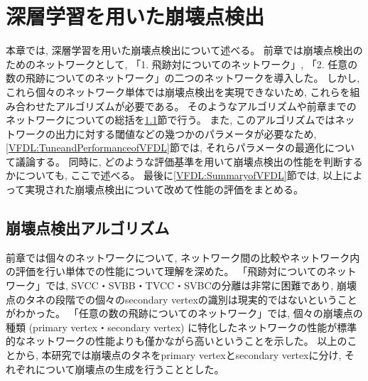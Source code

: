 
\chapter{深層学習を用いた崩壊点検出} \label{chap:VertexFinderwithDL}

本章では, 深層学習を用いた崩壊点検出について述べる。
前章では崩壊点検出のためのネットワークとして, 「1. 飛跡対についてのネットワーク」, 「2. 任意の数の飛跡についてのネットワーク」の二つのネットワークを導入した。
しかし, これら個々のネットワーク単体では崩壊点検出を実現できないため, これらを組み合わせたアルゴリズムが必要である。
そのようなアルゴリズムや前章までのネットワークについての総括を\ref{VFDL:AlgorithmofVFDL}節で行う。
また, このアルゴリズムではネットワークの出力に対する閾値などの幾つかのパラメータが必要なため, \ref{VFDL:TuneandPerformanceofVFDL}節では, それらパラメータの最適化について議論する。
同時に, どのような評価基準を用いて崩壊点検出の性能を判断するかについても, ここで述べる。
最後に\ref{VFDL:SummaryofVFDL}節では, 以上によって実現された崩壊点検出について改めて性能の評価をまとめる。


\section{崩壊点検出アルゴリズム} \label{VFDL:AlgorithmofVFDL}

前章では個々のネットワークについて, ネットワーク間の比較やネットワーク内の評価を行い単体での性能について理解を深めた。
「飛跡対についてのネットワーク」では, SVCC・SVBB・TVCC・SVBCの分離は非常に困難であり, 崩壊点のタネの段階での個々のsecondary vertexの識別は現実的ではないということがわかった。
「任意の数の飛跡についてのネットワーク」では, 個々の崩壊点の種類 (primary vertex・secondary vertex) に特化したネットワークの性能が標準的なネットワークの性能よりも僅かながら高いということを示した。
以上のことから, 本研究では崩壊点のタネをprimary vertexとsecondary vertexに分け, それぞれについて崩壊点の生成を行うこととした。

